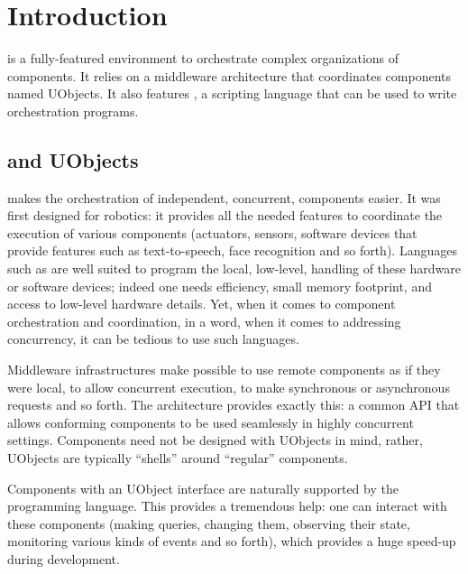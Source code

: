 
\chapter{Introduction}

\usdk is a fully-featured environment to orchestrate complex
organizations of components.  It relies on a middleware architecture
that coordinates components named UObjects.  It also features \us, a
scripting language that can be used to write orchestration programs.

\section{\urbi and UObjects}

\urbi makes the orchestration of independent, concurrent, components easier.
It was first designed for robotics: it provides all the needed features to
coordinate the execution of various components (actuators, sensors, software
devices that provide features such as text-to-speech, face recognition and
so forth).  Languages such as \Cxx are well suited to program the local,
low-level, handling of these hardware or software devices; indeed one needs
efficiency, small memory footprint, and access to low-level hardware
details.  Yet, when it comes to component orchestration and coordination, in
a word, when it comes to addressing concurrency, it can be tedious to use
such languages.

Middleware infrastructures make possible to use remote components as if they
were local, to allow concurrent execution, to make synchronous or
asynchronous requests and so forth.  The  \Cxx architecture
provides exactly this: a common API that allows conforming components to be
used seamlessly in highly concurrent settings.  Components need not be
designed with UObjects in mind, rather, UObjects are typically ``shells''
around ``regular'' components.

Components with an UObject interface are naturally supported by the \us
programming language.  This provides a tremendous help: one can interact
with these components (making queries, changing them, observing their state,
monitoring various kinds of events and so forth), which provides a huge
speed-up during development.

